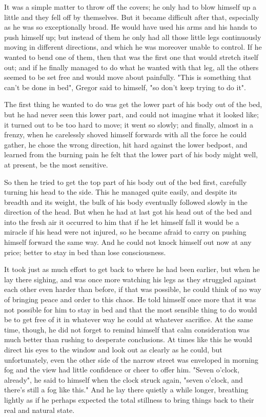 It was a simple matter to throw off the covers; he only had to blow himself up a little and they fell off by themselves. But it became difficult after that, especially as he was so exceptionally broad. He would have used his arms and his hands to push himself up; but instead of them he only had all those little legs continuously moving in different directions, and which he was moreover unable to control. If he wanted to bend one of them, then that was the first one that would stretch itself out; and if he finally managed to do what he wanted with that leg, all the others seemed to be set free and would move about painfully. "This is something that can't be done in bed", Gregor said to himself, "so don't keep trying to do it".

The first thing he wanted to do was get the lower part of his body out of the bed, but he had never seen this lower part, and could not imagine what it looked like; it turned out to be too hard to move; it went so slowly; and finally, almost in a frenzy, when he carelessly shoved himself forwards with all the force he could gather, he chose the wrong direction, hit hard against the lower bedpost, and learned from the burning pain he felt that the lower part of his body might well, at present, be the most sensitive.

So then he tried to get the top part of his body out of the bed first, carefully turning his head to the side. This he managed quite easily, and despite its breadth and its weight, the bulk of his body eventually followed slowly in the direction of the head. But when he had at last got his head out of the bed and into the fresh air it occurred to him that if he let himself fall it would be a miracle if his head were not injured, so he became afraid to carry on pushing himself forward the same way. And he could not knock himself out now at any price; better to stay in bed than lose consciousness.

It took just as much effort to get back to where he had been earlier, but when he lay there sighing, and was once more watching his legs as they struggled against each other even harder than before, if that was possible, he could think of no way of bringing peace and order to this chaos. He told himself once more that it was not possible for him to stay in bed and that the most sensible thing to do would be to get free of it in whatever way he could at whatever sacrifice. At the same time, though, he did not forget to remind himself that calm consideration was much better than rushing to desperate conclusions. At times like this he would direct his eyes to the window and look out as clearly as he could, but unfortunately, even the other side of the narrow street was enveloped in morning fog and the view had little confidence or cheer to offer him. "Seven o'clock, already", he said to himself when the clock struck again, "seven o'clock, and there's still a fog like this." And he lay there quietly a while longer, breathing lightly as if he perhaps expected the total stillness to bring things back to their real and natural state.


